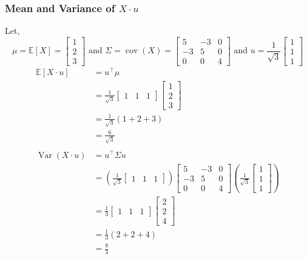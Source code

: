 \documentclass{article}
\begin{document}
{\subsubsection*{Mean and Variance of $X\cdot u$}
Let,
 $$\mu = \mathbb{E}[X] = \begin{bmatrix}1 \\ 2 \\ 3\end{bmatrix} \text{  and   } \Sigma=\operatorname{cov}(X)=
\begin{bmatrix}
5 & -3 & 0 \\
-3 & 5 & 0 \\
0 & 0 & 4
\end{bmatrix} \text{  and   } u=\dfrac{1}{\sqrt{3}}\begin{bmatrix}1 \\ 1 \\ 1\end{bmatrix}$$
\begin{align*}
\mathbb{E}[X\cdot u] &= u^\top \mu \\
&= \frac{1}{\sqrt{3}}\begin{bmatrix}1 & 1 & 1\end{bmatrix}\begin{bmatrix}1 \\ 2 \\ 3\end{bmatrix} \\
&= \frac{1}{\sqrt{3}}(1+2+3) \\
&= \frac{6}{\sqrt{3}}\\\\
\operatorname{Var}(X\cdot u) &= u^\top \Sigma u \\
&= \left(\frac{1}{\sqrt{3}}\begin{bmatrix}1 & 1 & 1\end{bmatrix}\right)
\begin{bmatrix}
5 & -3 & 0 \\
-3 & 5 & 0 \\
0 & 0 & 4
\end{bmatrix}
\left(\frac{1}{\sqrt{3}}\begin{bmatrix}1 \\ 1 \\ 1\end{bmatrix}\right) \\
&= \frac{1}{3}\begin{bmatrix}1 & 1 & 1\end{bmatrix}\begin{bmatrix}2 \\ 2 \\ 4\end{bmatrix} \\
&= \frac{1}{3}(2+2+4) \\
&= \frac{8}{3}
\end{align*}
}
\end{document}
